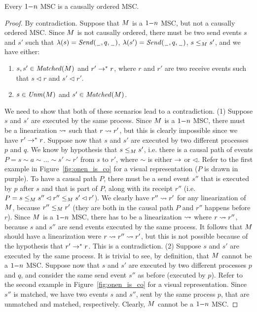 
\begin{proposition}%
	Every $1\mathsf{-}n$ MSC is a causally ordered MSC.
\end{proposition}
\begin{proof}
By contradiction. Suppose that $M$ is a $1\mathsf{-}n$ MSC, but not a causally ordered MSC. Since $M$ is not causally ordered, there must be two send events $s$ and $s'$ such that $\lambda(s)={\mathit{Send}(\hspace{0.1em}\underline{\hspace{0.5em}}\hspace{0.1em},q,\hspace{0.1em}\underline{\hspace{0.5em}}\hspace{0.1em})}$, $\lambda(s')={\mathit{Send}(\hspace{0.1em}\underline{\hspace{0.5em}}\hspace{0.1em},q,\hspace{0.1em}\underline{\hspace{0.5em}}\hspace{0.1em})}$, $s \le_M s'$, and we have either:
\begin{enumerate}\itemsep=0.5ex
	\item $s,s' \in \mathit{Matched}(M)$ and $r' \to^* r$, where $r$ and $r'$ are two receive events such that $s \lhd r$ and $s' \lhd r'$.
	\item  $s \in \mathit{Unm}(M)$ and $s' \in \mathit{Matched}(M)$.
\end{enumerate}
We need to show that both of these scenarios lead to a contradiction. (1) Suppose $s$ and $s'$ are executed by the same process. Since $M$ is a $1\mathsf{-}n$ MSC, there must be a linearization $\rightsquigarrow$ such that $r \rightsquigarrow r'$, but this is clearly impossible since we have $r' \to^* r$. Suppose now that $s$ and $s'$ are executed by two different processes $p$ and $q$. We know by hypothesis that $s \le_M s'$, i.e. there is a causal path of events $P = s \sim a \sim \dots \sim s' \sim r'$ from $s$ to $r'$, where $\sim$ is either $\to$ or $\lhd$. Refer to the first example in Figure~\ref{fig:onen_is_co} for a visual representation ($P$ is drawn in purple). To have a causal path $P$, there must be a send event $s''$ that is executed by $p$ after $s$ and that is part of $P$, along with its receipt $r''$ (i.e. $P = s \le_M s'' \lhd r'' \le_M s' \lhd r'$). We clearly have $r'' \rightsquigarrow r'$ for any linearization of $M$, because $r'' \le_M r'$ (they are both in the causal path $P$ and $r''$ happens before $r$). Since $M$ is a $1\mathsf{-}n$ MSC, there has to be a linearization $\rightsquigarrow$ where $r \rightsquigarrow r''$, because $s$ and $s''$ are send events executed by the same process. It follows that $M$ should have a linearization were $r \rightsquigarrow r'' \rightsquigarrow r'$, but this is not possible because of the hypothesis that $r' \to^* r$. This is a contradiction. (2) Suppose $s$ and $s'$ are executed by the same process. It is trivial to see, by definition, that $M$ cannot be a $1\mathsf{-}n$ MSC. Suppose now that $s$ and $s'$ are executed by two different processes $p$ and $q$, and consider the same send event $s''$ as before (executed by $p$). Refer to the second example in Figure~\ref{fig:onen_is_co} for a visual representation. Since $s''$ is matched, we have two events $s$ and $s''$, sent by the same process $p$, that are unmatched and matched, respectively. Clearly, $M$ cannot be a $1\mathsf{-}n$ MSC.
\end{proof}

